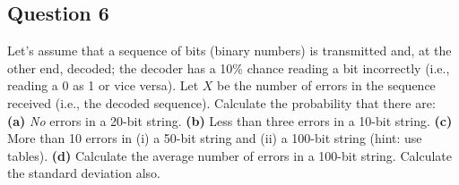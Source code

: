 
\subsection*{Question 6}

Let's assume that a sequence of bits (binary numbers) is transmitted and, at the other end, decoded; the decoder has a 10\% chance reading a bit incorrectly (i.e., reading a 0 as 1 or vice versa). Let $X$ be the number of errors in the sequence received (i.e., the decoded sequence). Calculate the probability that there are: \\[-0.2cm]

{\bf(a)} \emph{No} errors in a 20-bit string. 
{\bf(b)} Less than three errors in a 10-bit string. 
{\bf(c)} More than 10 errors in (i) a 50-bit string and (ii) a 100-bit string (hint: use tables). 
{\bf(d)} Calculate the average number of errors in a 100-bit string. Calculate the standard deviation also.


